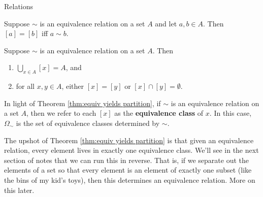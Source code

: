 \begin{section}{Relations}
\begin{theorem}
Suppose $\sim$ is an equivalence relation on a set $A$ and let $a,b\in A$.  Then $[a]=[b]$ iff $a\sim b$.
\end{theorem}

\begin{theorem}\label{thm:equiv yields partition}
Suppose $\sim$ is an equivalence relation on a set $A$.  Then
\begin{enumerate}
\item $\bigcup_{x\in A}[x]=A$, and
\item for all $x,y\in A$, either $[x]=[y]$ or $[x]\cap [y]=\emptyset$.
\end{enumerate}
\end{theorem}

\begin{definition}
In light of Theorem \ref{thm:equiv yields partition}, if $\sim$ is an equivalence relation on a set $A$, then we refer to each $[x]$ as the \textbf{equivalence class} of $x$.  In this case, $\Omega_{\sim}$ is the set of equivalence classes determined by $\sim$.
\end{definition}

\begin{remark}
The upshot of Theorem \ref{thm:equiv yields partition} is that given an equivalence relation, every element lives in exactly one equivalence class.  We'll see in the next section of notes that we can run this in reverse.  That is, if we separate out the elements of a set so that every element is an element of exactly one subset (like the bins of my kid's toys), then this determines an equivalence relation.  More on this later.
\end{remark}

\end{section}


